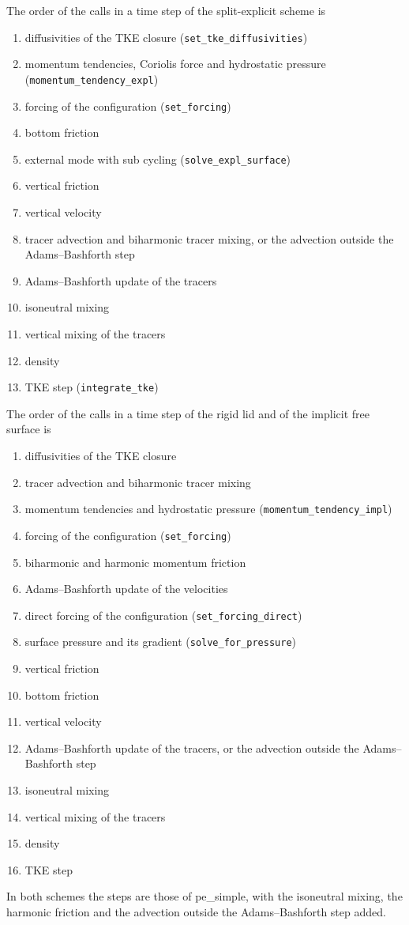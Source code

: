 \documentclass[12pt]{article}
\begin{document}
The order of the calls in a time step of the split-explicit scheme is
\begin{enumerate}
\item diffusivities of the TKE closure (\verb|set_tke_diffusivities|)
\item momentum tendencies, Coriolis force and hydrostatic pressure (\verb|momentum_tendency_expl|)
\item forcing of the configuration (\verb|set_forcing|)
\item bottom friction
\item external mode with sub cycling (\verb|solve_expl_surface|)
\item vertical friction
\item vertical velocity
\item tracer advection and biharmonic tracer mixing, or the advection outside the Adams--Bashforth step
\item Adams--Bashforth update of the tracers
\item isoneutral mixing
\item vertical mixing of the tracers
\item density
\item TKE step (\verb|integrate_tke|)
\end{enumerate}

The order of the calls in a time step of the rigid lid and of the implicit free surface is
\begin{enumerate}
\item diffusivities of the TKE closure
\item tracer advection and biharmonic tracer mixing
\item momentum tendencies and hydrostatic pressure (\verb|momentum_tendency_impl|)
\item forcing of the configuration (\verb|set_forcing|)
\item biharmonic and harmonic momentum friction
\item Adams--Bashforth update of the velocities
\item direct forcing of the configuration (\verb|set_forcing_direct|)
\item surface pressure and its gradient (\verb|solve_for_pressure|)
\item vertical friction
\item bottom friction
\item vertical velocity
\item Adams--Bashforth update of the tracers, or the advection outside the Adams--Bashforth step
\item isoneutral mixing
\item vertical mixing of the tracers
\item density
\item TKE step
\end{enumerate}
In both schemes the steps are those of pe\_simple, with the isoneutral mixing, the harmonic friction and the advection outside the Adams--Bashforth step added.
\end{document}
